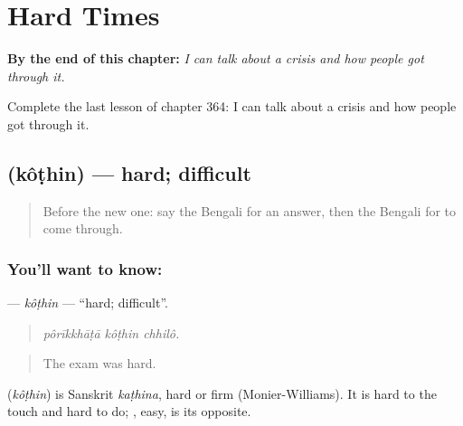 
\chapter{Hard Times}
\label{ch:bn-hard-times}

\begin{chapteropening}
\textbf{By the end of this chapter:} \emph{I can talk about a crisis and how people got through it.}

Complete the last lesson of chapter 364: I can talk about a crisis and how people got through it.
\end{chapteropening}

\section[\texorpdfstring{\bn{কঠিন} (kôṭhin)}{কঠিন (kôṭhin)}]{ (kôṭhin) — hard; difficult}

\label{lesson:BN-C364-kothin}



\begin{quote}
Before the new one: say the Bengali for an answer, then the Bengali for to come through.
\end{quote}

\subsection*{You'll want to know: }
\textbf{} — \emph{kôṭhin} — \textquotedblleft{}hard; difficult\textquotedblright{}.

\begin{quote}
  
\end{quote}

\begin{quote}
\emph{pôrīkkhāṭā kôṭhin chhilô.}
\end{quote}

\begin{quote}
The exam was hard.
\end{quote}

\begin{cousinweb}
\textbf{} (\emph{kôṭhin}) is Sanskrit \emph{kaṭhina}, hard or firm (Monier-Williams). It is hard to the touch and hard to do; , easy, is its opposite.
\end{cousinweb}

